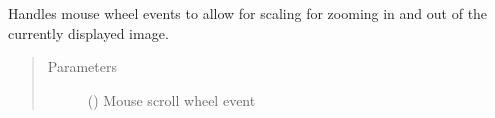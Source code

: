 \documentclass[letterpaper,10pt,english]{sphinxmanual}
\begin{document}
\begin{fulllineitems}

\begin{fulllineitems}
\label{\detokenize{polo.widgets:polo.widgets.slideshow_viewer.PhotoViewer.wheelEvent}}
Handles mouse wheel events to allow for scaling for zooming in and
out of the currently displayed image.
\begin{quote}\begin{description}
\item[{Parameters}] \leavevmode
{} () \textendash{} Mouse scroll wheel event

\end{description}\end{quote}

\end{fulllineitems}


\end{fulllineitems}

\end{document}
